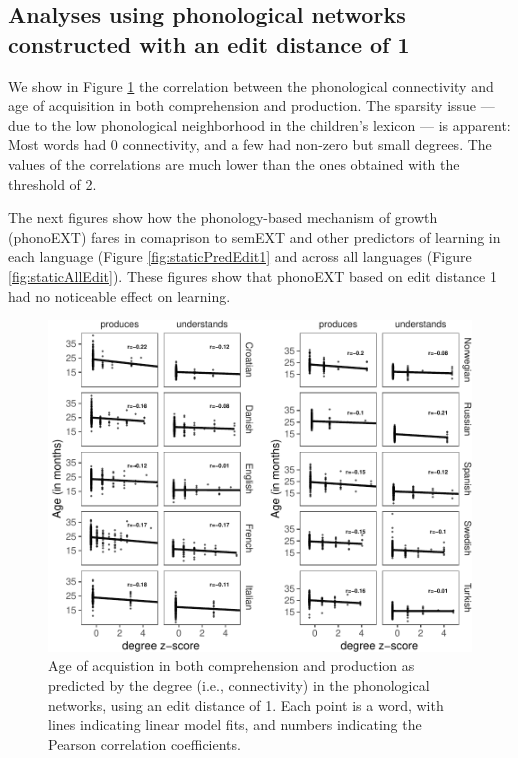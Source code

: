 \documentclass[english,,man,floatsintext]{apa6}
\begin{document}
\hypertarget{analyses-using-phonological-networks-constructed-with-an-edit-distance-of-1}{%
\subsection{Analyses using phonological networks constructed with an edit distance of 1}\label{analyses-using-phonological-networks-constructed-with-an-edit-distance-of-1}}

We show in Figure \ref{fig:corrPlot} the correlation between the phonological connectivity and age of acquisition in both comprehension and production. The sparsity issue --- due to the low phonological neighborhood in the children's lexicon --- is apparent: Most words had 0 connectivity, and a few had non-zero but small degrees. The values of the correlations are much lower than the ones obtained with the threshold of 2.

The next figures show how the phonology-based mechanism of growth (phonoEXT) fares in comaprison to semEXT and other predictors of learning in each language (Figure \ref{fig:staticPredEdit1} and across all languages (Figure \ref{fig:staticAllEdit}). These figures show that phonoEXT based on edit distance 1 had no noticeable effect on learning.

\begin{figure}[!h]
\includegraphics[width=\textwidth]{ms_files/figure-latex/corrPlot-1} \caption{Age of acquistion in both comprehension and production as predicted by the degree (i.e., connectivity) in the phonological networks, using an edit distance of 1. Each point is a word, with lines indicating linear model fits, and numbers indicating the Pearson correlation coefficients.}\label{fig:corrPlot}
\end{figure}
\end{document}
